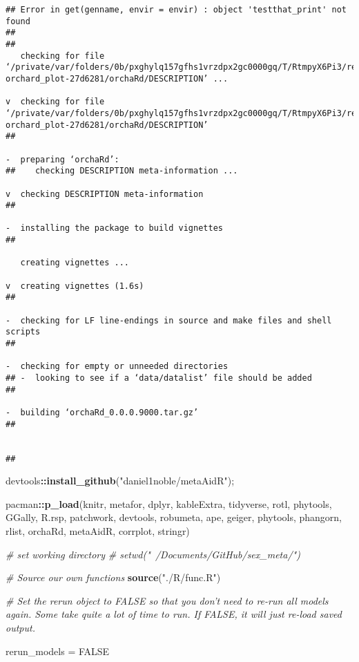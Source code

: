 \documentclass[]{article}
\newenvironment{Shaded}{\begin{snugshade}}{\end{snugshade}}
\newcommand{\KeywordTok}[1]{\textcolor[rgb]{0.13,0.29,0.53}{\textbf{#1}}}
\newcommand{\StringTok}[1]{\textcolor[rgb]{0.31,0.60,0.02}{#1}}
\newcommand{\CommentTok}[1]{\textcolor[rgb]{0.56,0.35,0.01}{\textit{#1}}}
\newcommand{\OtherTok}[1]{\textcolor[rgb]{0.56,0.35,0.01}{#1}}
\newcommand{\OperatorTok}[1]{\textcolor[rgb]{0.81,0.36,0.00}{\textbf{#1}}}
\newcommand{\NormalTok}[1]{#1}
\begin{document}
\begin{verbatim}
## Error in get(genname, envir = envir) : object 'testthat_print' not found
## 
##   
   checking for file ‘/private/var/folders/0b/pxghylq157gfhs1vrzdpx2gc0000gq/T/RtmpyX6Pi3/remotescf00568b00af/itchyshin-orchard_plot-27d6281/orchaRd/DESCRIPTION’ ...
  
v  checking for file ‘/private/var/folders/0b/pxghylq157gfhs1vrzdpx2gc0000gq/T/RtmpyX6Pi3/remotescf00568b00af/itchyshin-orchard_plot-27d6281/orchaRd/DESCRIPTION’
## 
  
-  preparing ‘orchaRd’:
##    checking DESCRIPTION meta-information ...
  
v  checking DESCRIPTION meta-information
## 
  
-  installing the package to build vignettes
## 
  
   creating vignettes ...
  
v  creating vignettes (1.6s)
## 
  
-  checking for LF line-endings in source and make files and shell scripts
## 
  
-  checking for empty or unneeded directories
## -  looking to see if a ‘data/datalist’ file should be added
## 
  
-  building ‘orchaRd_0.0.0.9000.tar.gz’
## 
  
   
## 
\end{verbatim}

\begin{Shaded}
\begin{Highlighting}[]
\NormalTok{  devtools}\OperatorTok{::}\KeywordTok{install_github}\NormalTok{(}\StringTok{"daniel1noble/metaAidR"}\NormalTok{); }

\NormalTok{pacman}\OperatorTok{::}\KeywordTok{p_load}\NormalTok{(knitr, metafor, dplyr, kableExtra, tidyverse, rotl, phytools, GGally, R.rsp, patchwork, devtools, robumeta, ape, geiger, phytools, phangorn, rlist, orchaRd, metaAidR, corrplot, stringr)}

\CommentTok{# set working directory}
 \CommentTok{# setwd("~/Documents/GitHub/sex_meta/")}
  
\CommentTok{# Source our own functions}
  \KeywordTok{source}\NormalTok{(}\StringTok{"./R/func.R"}\NormalTok{)}
 
\CommentTok{# Set the rerun object to FALSE so that you don't need to re-run all models again. Some take quite a lot of time to run. If FALSE, it will just re-load saved output. }

\NormalTok{  rerun_models =}\StringTok{ }\OtherTok{FALSE}
\end{Highlighting}
\end{Shaded}
\end{document}

